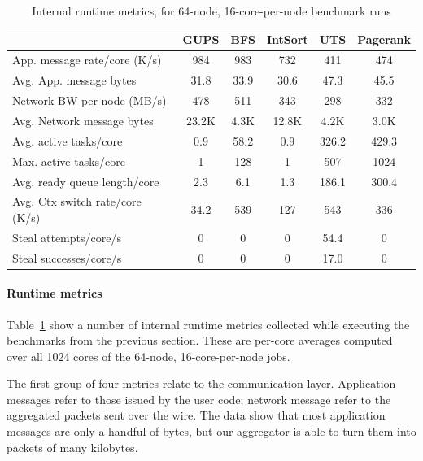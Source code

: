 \begin{table}[htb]
\small
\begin{center}
\setlength{\tabcolsep}{1pt}
\begin{tabular}{l|c|c|c|c|c}
                                &  GUPS  &  BFS & IntSort &   UTS & Pagerank \\ \hline
App. message rate/core (K/s)    & 984    &  983 &     732 &   411 &      474 \\
Avg. App. message bytes         & 31.8   & 33.9 &    30.6 &  47.3 &     45.5 \\
Network BW per node (MB/s)      & 478    & 511  &     343 &   298 &      332 \\
Avg. Network message bytes      & 23.2K  & 4.3K &   12.8K &  4.2K &     3.0K \\ \hline
Avg. active tasks/core          & 0.9    & 58.2 &     0.9 & 326.2 &    429.3 \\
Max. active tasks/core          & 1      & 128  &       1 &   507 &     1024 \\
Avg. ready queue length/core    & 2.3    & 6.1  &     1.3 & 186.1 &    300.4 \\
Avg. Ctx switch rate/core (K/s) & 34.2   & 539  &     127 &   543 &      336 \\ 
Steal attempts/core/s           & 0      & 0    &       0 &  54.4 &        0 \\
Steal successes/core/s          & 0      & 0    &       0 &  17.0 &        0 \\
\end{tabular}
\end{center}
\caption{Internal runtime metrics, for 64-node, 16-core-per-node benchmark runs}
\label{tab:grappa-metrics}
\end{table}

\paragraph{Runtime metrics}
Table~\ref{tab:grappa-metrics} show a number of internal runtime
metrics collected while executing the benchmarks from the previous
section. These are per-core averages computed over all 1024 cores of
the 64-node, 16-core-per-node jobs.

The first group of four metrics relate to the communication
layer. Application messages refer to those issued by the user code;
network message refer to the aggregated packets sent over the wire. The
data show that most application messages are only a handful of bytes,
but our aggregator is able to turn them into packets of many kilobytes.

